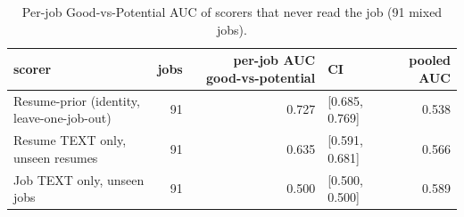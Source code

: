 \begin{table}
\caption{Per-job Good-vs-Potential AUC of scorers that never read the job (91 mixed jobs).}
\label{tab:t6b_resume_text_only}
\begin{tabular}{lrrlr}
\toprule
scorer & jobs & per-job AUC good-vs-potential & CI & pooled AUC \\
\midrule
Resume-prior (identity, leave-one-job-out) & 91 & 0.727 & [0.685, 0.769] & 0.538 \\
Resume TEXT only, unseen resumes & 91 & 0.635 & [0.591, 0.681] & 0.566 \\
Job TEXT only, unseen jobs & 91 & 0.500 & [0.500, 0.500] & 0.589 \\
\bottomrule
\end{tabular}
\end{table}
